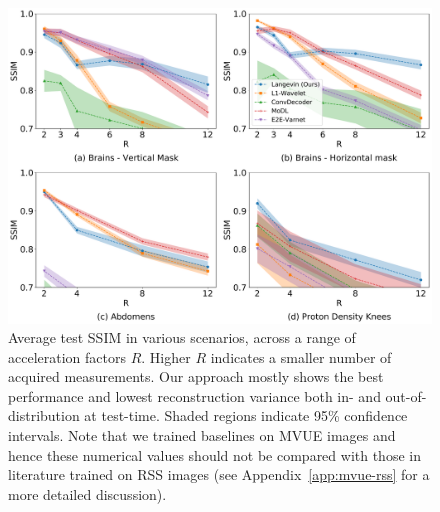 \begin{figure}
    \centering
    \includegraphics[width=\columnwidth]{main-ssim-comp.pdf}
    \caption{\small Average test SSIM in various scenarios, across a range of acceleration factors $R$. Higher $R$ indicates a smaller number of acquired measurements. Our approach mostly shows the best performance and lowest reconstruction variance both in- and out-of-distribution at test-time. Shaded regions indicate 95\% confidence intervals. Note that we trained baselines on MVUE images and hence these numerical values should not be compared with those in literature trained on RSS images (see Appendix~\ref{app:mvue-rss} for a more detailed discussion).}
    \label{fig:main-ssim}
\end{figure}

